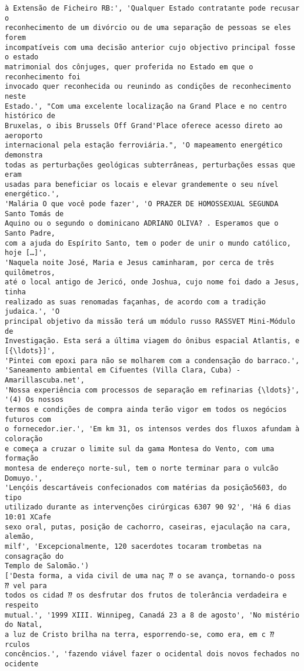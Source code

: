\documentclass[10pt]{article}
\begin{document}
\begin{Verbatim}[commandchars=\\\{\}]
à Extensão de Ficheiro RB:', 'Qualquer Estado contratante pode recusar o
reconhecimento de um divórcio ou de uma separação de pessoas se eles forem
incompatíveis com uma decisão anterior cujo objectivo principal fosse o estado
matrimonial dos cônjuges, quer proferida no Estado em que o reconhecimento foi
invocado quer reconhecida ou reunindo as condições de reconhecimento neste
Estado.', "Com uma excelente localização na Grand Place e no centro histórico de
Bruxelas, o ibis Brussels Off Grand'Place oferece acesso direto ao aeroporto
internacional pela estação ferroviária.", 'O mapeamento energético demonstra
todas as perturbações geológicas subterrâneas, perturbações essas que eram
usadas para beneficiar os locais e elevar grandemente o seu nível energético.',
'Malária O que você pode fazer', 'O PRAZER DE HOMOSSEXUAL SEGUNDA Santo Tomás de
Aquino ou o segundo o dominicano ADRIANO OLIVA? . Esperamos que o Santo Padre,
com a ajuda do Espírito Santo, tem o poder de unir o mundo católico, hoje […]',
'Naquela noite José, Maria e Jesus caminharam, por cerca de três quilômetros,
até o local antigo de Jericó, onde Joshua, cujo nome foi dado a Jesus, tinha
realizado as suas renomadas façanhas, de acordo com a tradição judaica.', 'O
principal objetivo da missão terá um módulo russo RASSVET Mini-Módulo de
Investigação. Esta será a última viagem do ônibus espacial Atlantis, e [{\ldots}]',
'Pintei com epoxi para não se molharem com a condensação do barraco.',
'Saneamento ambiental em Cifuentes (Villa Clara, Cuba) - Amarillascuba.net',
'Nossa experiência com processos de separação em refinarias {\ldots}', '(4) Os nossos
termos e condições de compra ainda terão vigor em todos os negócios futuros com
o fornecedor.ier.', 'Em km 31, os intensos verdes dos fluxos afundam à coloração
e começa a cruzar o limite sul da gama Montesa do Vento, com uma formação
montesa de endereço norte-sul, tem o norte terminar para o vulcão Domuyo.',
'Lençóis descartáveis confecionados com matérias da posição5603, do tipo
utilizado durante as intervenções cirúrgicas 6307 90 92', 'Há 6 dias 10:01 XCafe
sexo oral, putas, posição de cachorro, caseiras, ejaculação na cara, alemão,
milf', 'Excepcionalmente, 120 sacerdotes tocaram trombetas na consagração do
Templo de Salomão.')
['Desta forma, a vida civil de uma naç ⁇ o se avança, tornando-o poss ⁇ vel para
todos os cidad ⁇ os desfrutar dos frutos de tolerância verdadeira e respeito
mutual.', '1999 XIII. Winnipeg, Canadá 23 a 8 de agosto', 'No mistério do Natal,
a luz de Cristo brilha na terra, esporrendo-se, como era, em c ⁇ rculos
concêncios.', 'fazendo viável fazer o ocidental dois novos fechados no ocidente

\end{Verbatim}
\end{document}
